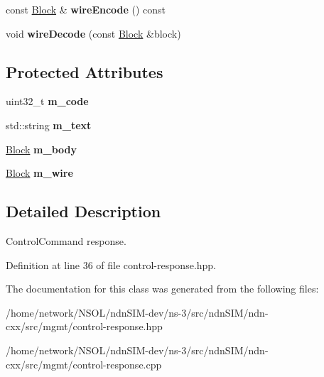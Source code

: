 \begin{DoxyCompactItemize}
\item 
const \hyperlink{classndn_1_1Block}{Block} \& {\bfseries wire\+Encode} () const\hypertarget{classndn_1_1mgmt_1_1ControlResponse_a7e2f8a08ed58a70757c386b0f4f50470}{}\label{classndn_1_1mgmt_1_1ControlResponse_a7e2f8a08ed58a70757c386b0f4f50470}

\item 
void {\bfseries wire\+Decode} (const \hyperlink{classndn_1_1Block}{Block} \&block)\hypertarget{classndn_1_1mgmt_1_1ControlResponse_a40edbe03d769972ae73449b43fb95536}{}\label{classndn_1_1mgmt_1_1ControlResponse_a40edbe03d769972ae73449b43fb95536}

\end{DoxyCompactItemize}
\subsection*{Protected Attributes}
\begin{DoxyCompactItemize}
\item 
uint32\+\_\+t {\bfseries m\+\_\+code}\hypertarget{classndn_1_1mgmt_1_1ControlResponse_ad8909ffc83767aa9263b1a3a884d332c}{}\label{classndn_1_1mgmt_1_1ControlResponse_ad8909ffc83767aa9263b1a3a884d332c}

\item 
std\+::string {\bfseries m\+\_\+text}\hypertarget{classndn_1_1mgmt_1_1ControlResponse_a395a8f8e1fbab919b0a78d532a81f19b}{}\label{classndn_1_1mgmt_1_1ControlResponse_a395a8f8e1fbab919b0a78d532a81f19b}

\item 
\hyperlink{classndn_1_1Block}{Block} {\bfseries m\+\_\+body}\hypertarget{classndn_1_1mgmt_1_1ControlResponse_af8e2198c6e53fefec41a7c4094067cdd}{}\label{classndn_1_1mgmt_1_1ControlResponse_af8e2198c6e53fefec41a7c4094067cdd}

\item 
\hyperlink{classndn_1_1Block}{Block} {\bfseries m\+\_\+wire}\hypertarget{classndn_1_1mgmt_1_1ControlResponse_ac8a148105b7e4a28855555794b3c0be4}{}\label{classndn_1_1mgmt_1_1ControlResponse_ac8a148105b7e4a28855555794b3c0be4}

\end{DoxyCompactItemize}


\subsection{Detailed Description}
Control\+Command response. 

Definition at line 36 of file control-\/response.\+hpp.



The documentation for this class was generated from the following files\+:\begin{DoxyCompactItemize}
\item 
/home/network/\+N\+S\+O\+L/ndn\+S\+I\+M-\/dev/ns-\/3/src/ndn\+S\+I\+M/ndn-\/cxx/src/mgmt/control-\/response.\+hpp\item 
/home/network/\+N\+S\+O\+L/ndn\+S\+I\+M-\/dev/ns-\/3/src/ndn\+S\+I\+M/ndn-\/cxx/src/mgmt/control-\/response.\+cpp\end{DoxyCompactItemize}
